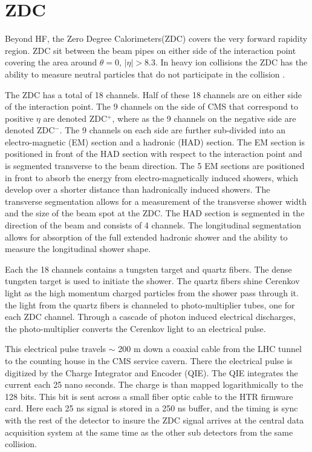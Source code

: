   \section{ZDC} 
    Beyond HF, the Zero Degree Calorimeters(ZDC) covers the very forward 
      rapidity region.
    ZDC sit between the beam pipes on either side of the interaction point 
      covering the area around $\theta = 0$, $|\eta| > 8.3$.
    In heavy ion collisions the ZDC has the ability to measure neutral particles 
    	that do not participate in the collision \cite{tCmsE}.
    
    The ZDC has a total of 18 channels.
        Half of these 18 channels are on either side of the interaction point.
    The 9 channels on the side of CMS that correspond to positive $\eta$
      are denoted ZDC$^{+}$, where as the 9 channels on the negative side are
      denoted ZDC$^{-}$.
    The 9 channels on each side are further sub-divided into an electro-magnetic  
      (EM) section and a hadronic (HAD) section.
    The EM section is positioned in front of the HAD section with respect to the 
      interaction point and is segmented transverse to the beam direction.
    The 5 EM sections are positioned in front to absorb the energy from 
      electro-magnetically induced showers, which develop over a shorter distance 
      than hadronically induced showers.
    The transverse segmentation allows for a measurement of the transverse shower
      width and the size of the beam spot at the ZDC.
    The HAD section is segmented in the direction of the beam and consists of 4
      channels.
    The longitudinal segmentation allows for absorption of the full extended 
      hadronic shower and the ability to measure the longitudinal shower shape.
    
    Each the 18 channels contains a tungsten target and quartz fibers.
    The dense tungsten target is used to initiate the shower.
    The quartz fibers shine Cerenkov light as the high momentum charged particles
      from the shower pass through it. 
    the light from the quartz fibers is channeled to photo-multiplier tubes, one 
      for each ZDC channel. 
    Through a cascade of photon induced electrical discharges, the photo-multiplier
      converts the Cerenkov light to an electrical pulse. 
    
    This electrical pulse travels $\sim$ 200 m down a coaxial cable from the LHC
      tunnel to the counting house in the CMS service cavern. 
    There the electrical pulse is digitized by the Charge Integrator and Encoder 
      (QIE).
    The QIE integrates the current each 25 nano seconds.
    The charge is than mapped logarithmically to the 128 bits. 
    This bit is sent across a small fiber optic cable to the HTR firmware card.
    Here each 25 ns signal is stored in a 250 ns buffer, and the timing is sync
      with the rest of the detector to insure the ZDC signal arrives at the central
      data acquisition system at the same time as the other sub detectors from the 
      same collision. 
    
